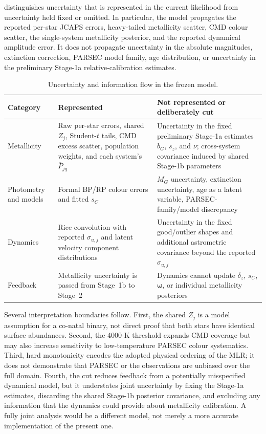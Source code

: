  distinguishes uncertainty that is represented in the
current likelihood from uncertainty held fixed or omitted.  In particular, the
model propagates the reported per-star JCAPS errors, heavy-tailed metallicity
scatter, CMD colour scatter, the single-system metallicity posterior, and the
reported dynamical amplitude error.  It does not propagate uncertainty in the
absolute magnitudes, extinction correction, PARSEC model family, age
distribution, or uncertainty in the preliminary Stage-1a relative-calibration
estimates.

\begin{table}[htbp]
\centering
\caption{Uncertainty and information flow in the frozen model.}
\label{tab:uncertainties}
\begin{tabularx}{\textwidth}{@{}lXX@{}}
\toprule
Category & Represented & Not represented or deliberately cut \\
\midrule
Metallicity & Raw per-star errors, shared $Z_j$, Student-$t$ tails,
CMD excess scatter, population weights, and each system's $\overline P_{jq}$
& Uncertainty in the fixed preliminary Stage-1a estimates $b_G$, $s_z$, and
$\nu$; cross-system covariance induced by shared Stage-1b parameters \\
Photometry and models & Formal BP/RP colour errors and fitted $s_C$
& $M_G$ uncertainty, extinction uncertainty, age as a latent variable,
PARSEC-family/model discrepancy \\
Dynamics & Rice convolution with reported $\sigma_{u,j}$ and latent velocity
component distributions & Uncertainty in the fixed good/outlier shapes and
additional astrometric covariance beyond the reported $\sigma_{u,j}$ \\
Feedback & Metallicity uncertainty is passed from Stage~1b to Stage~2
& Dynamics cannot update $\delta_z$, $s_C$, $\bm\omega$, or individual
metallicity posteriors \\
\bottomrule
\end{tabularx}
\end{table}

\FloatBarrier
Several interpretation boundaries follow.  First, the shared $Z_j$ is a model
assumption for a co-natal binary, not direct proof that both stars have identical
surface abundances.  Second, the 4000-K threshold expands CMD coverage but may
also increase sensitivity to low-temperature PARSEC colour systematics.  Third,
hard monotonicity encodes the adopted physical ordering of the MLR; it does not
demonstrate that PARSEC or the observations are unbiased over the full domain.
Fourth, the cut reduces feedback from a potentially misspecified dynamical
model, but it understates joint uncertainty by fixing the Stage-1a estimates,
discarding the shared Stage-1b posterior covariance, and excluding any
information that the dynamics could provide about metallicity calibration.  A
fully joint analysis would be a different model,
not merely a more accurate implementation of the present one.

